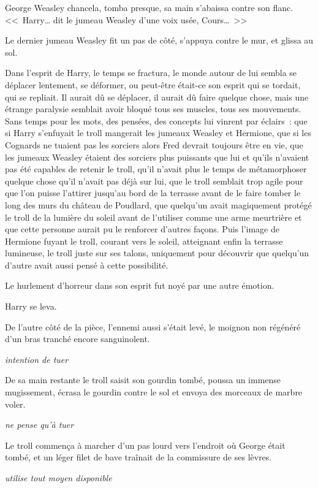 George Weasley chancela, tomba presque, sa main s'abaissa contre son flanc. <<~Harry… dit le jumeau Weasley d'une voix usée, Cours…~>>

Le dernier jumeau Weasley fit un pas de côté, s'appuya contre le mur, et glissa au sol.

Dans l'esprit de Harry, le temps se fractura, le monde autour de lui sembla se déplacer lentement, se déformer, ou peut-être était-ce son esprit qui se tordait, qui se repliait. Il aurait dû se déplacer, il aurait dû faire quelque chose, mais une étrange paralysie semblait avoir bloqué tous ses muscles, tous ses mouvements. Sans temps pour les mots, des pensées, des concepts lui vinrent par éclairs~: que si Harry s'enfuyait le troll mangerait les jumeaux Weasley et Hermione, que si les Cognards ne tuaient pas les sorciers alors Fred devrait toujours être en vie, que les jumeaux Weasley étaient des sorciers plus puissants que lui et qu'ils n'avaient pas été capables de retenir le troll, qu'il n'avait plus le temps de métamorphoser quelque chose qu'il n'avait pas déjà sur lui, que le troll semblait trop agile pour que l'on puisse l'attirer jusqu'au bord de la terrasse avant de le faire tomber le long des murs du château de Poudlard, que quelqu'un avait magiquement protégé le troll de la lumière du soleil avant de l'utiliser comme une arme meurtrière et que cette personne aurait pu le renforcer d'autres façons. Puis l'image de Hermione fuyant le troll, courant vers le soleil, atteignant enfin la terrasse lumineuse, le troll juste sur ses talons, uniquement pour découvrir que quelqu'un d'autre avait aussi pensé à cette possibilité.

Le hurlement d'horreur dans son esprit fut noyé par une autre émotion.

Harry se leva.

De l'autre côté de la pièce, l'ennemi aussi s'était levé, le moignon non régénéré d'un bras tranché encore sanguinolent.

\emph{intention de tuer}

De sa main restante le troll saisit son gourdin tombé, poussa un immense mugissement, écrasa le gourdin contre le sol et envoya des morceaux de marbre voler.

\emph{ne pense qu'à tuer}

Le troll commença à marcher d'un pas lourd vers l'endroit où George était tombé, et un léger filet de bave traînait de la commissure de ses lèvres.

\emph{utilise tout moyen disponible}

